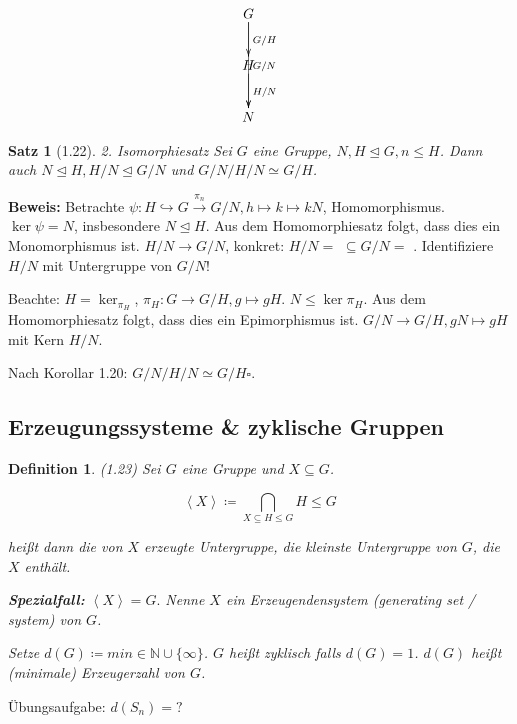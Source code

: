 \documentclass[10pt,a4paper]{article}
\newtheorem{defi}{Definition}
\newtheorem{satz}{Satz}
\begin{document}
\begin{displaymath}
    \xymatrix{ G \ar[d]^{G/H} \ar[dd]^{G/N} \\
               H \ar[d]^{H/N} \\
               N }
\end{displaymath}

\begin{satz}[1.22]{2. Isomorphiesatz}
Sei $G$ eine Gruppe, $N, H \trianglelefteq G, n \leq H$. Dann auch $N \trianglelefteq H, H / N \trianglelefteq G / N$ und $G/N / H/N \simeq G/H$.
\end{satz}
\textbf{Beweis:} Betrachte $\psi: H \hookrightarrow G
\xrightarrow{\pi_n} G/N, h \mapsto k \mapsto kN$,
Homomorphismus. $\ker\psi = N$, insbesondere $N \trianglelefteq H$. Aus dem Homomorphiesatz folgt, dass dies ein Monomorphismus ist. $H/N \to G/N$, konkret: $H/N=$ $\subseteq G/N =$ .
Identifiziere $H/N$ mit Untergruppe von $G/N$!

Beachte: $H = \ker_{\pi_H}$, $\pi_H: G \to G/H, g \mapsto gH$. $N \leq \ker\pi_H$. Aus dem Homomorphiesatz folgt, dass dies ein Epimorphismus ist. $G/N \to G/H, gN \mapsto gH$ mit Kern $H/N$.

Nach Korollar 1.20: $G/N / H/N \simeq G/H \square$.

\subsection{Erzeugungssysteme \& zyklische Gruppen}

\begin{defi}(1.23)
Sei $G$ eine Gruppe und $X \subseteq G$.

$$\left< X \right> \coloneqq \bigcap_{X \subseteq H \leqslant G} H \leqslant G$$

heißt dann die \emph{von $X$ erzeugte} Untergruppe, die kleinste Untergruppe von $G$, die $X$ enthält. 

\textbf{Spezialfall:} $\left< X \right> = G.$ Nenne $X$ ein \emph{Erzeugendensystem} (generating set / system) von $G$.

Setze $d(G) \coloneqq min$$\in \mathbb{N} \cup \{\infty\}$. $G$ heißt \emph{zyklisch} falls $d(G)=1$. $d(G)$ heißt \emph{(minimale) Erzeugerzahl} von $G$.
\end{defi}

Übungsaufgabe: $d(S_n) = ?$
\end{document}
